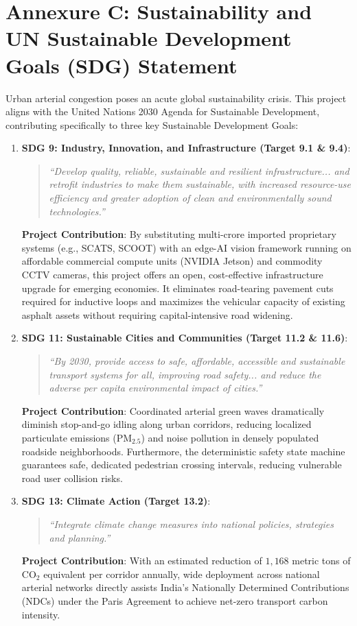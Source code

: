 \documentclass[12pt,a4paper,oneside]{report}
\begin{document}
\chapter*{Annexure C: Sustainability and UN Sustainable Development Goals (SDG) Statement}
\label{annex:sustainability}

Urban arterial congestion poses an acute global sustainability crisis. This project aligns with the United Nations 2030 Agenda for Sustainable Development, contributing specifically to three key Sustainable Development Goals:

\begin{enumerate}
    \item \textbf{SDG 9: Industry, Innovation, and Infrastructure (Target 9.1 \& 9.4)}:
    \begin{quote}
        \textit{``Develop quality, reliable, sustainable and resilient infrastructure... and retrofit industries to make them sustainable, with increased resource-use efficiency and greater adoption of clean and environmentally sound technologies.''}
    \end{quote}
    \textbf{Project Contribution}: By substituting multi-crore imported proprietary systems (e.g., SCATS, SCOOT) with an edge-AI vision framework running on affordable commercial compute units (NVIDIA Jetson) and commodity CCTV cameras, this project offers an open, cost-effective infrastructure upgrade for emerging economies. It eliminates road-tearing pavement cuts required for inductive loops and maximizes the vehicular capacity of existing asphalt assets without requiring capital-intensive road widening.

    \item \textbf{SDG 11: Sustainable Cities and Communities (Target 11.2 \& 11.6)}:
    \begin{quote}
        \textit{``By 2030, provide access to safe, affordable, accessible and sustainable transport systems for all, improving road safety... and reduce the adverse per capita environmental impact of cities.''}
    \end{quote}
    \textbf{Project Contribution}: Coordinated arterial green waves dramatically diminish stop-and-go idling along urban corridors, reducing localized particulate emissions ($\text{PM}_{2.5}$) and noise pollution in densely populated roadside neighborhoods. Furthermore, the deterministic safety state machine guarantees safe, dedicated pedestrian crossing intervals, reducing vulnerable road user collision risks.

    \item \textbf{SDG 13: Climate Action (Target 13.2)}:
    \begin{quote}
        \textit{``Integrate climate change measures into national policies, strategies and planning.''}
    \end{quote}
    \textbf{Project Contribution}: With an estimated reduction of $1,168$ metric tons of $\text{CO}_2$ equivalent per corridor annually, wide deployment across national arterial networks directly assists India's Nationally Determined Contributions (NDCs) under the Paris Agreement to achieve net-zero transport carbon intensity.
\end{enumerate}
\end{document}
